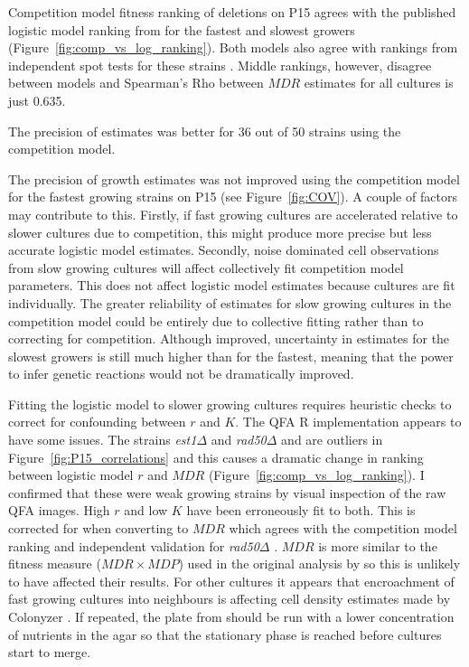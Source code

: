 Competition model fitness ranking of deletions on P15 agrees with the
published logistic model ranking from \citet{Addinall2011} for the
fastest and slowest growers
(Figure~\ref{fig:comp_vs_log_ranking}). Both models also agree with
rankings from independent spot tests for these strains
\citep{maringele2002exo1,zubko2004exo1,Holstein20141259,foster2006mrx}.
Middle rankings, however, disagree between models and Spearman's Rho
between \(MDR\) estimates for all cultures is just 0.635.

The precision of estimates was better for 36 out of 50 strains using
the competition model.

The
precision of growth estimates was not improved using the competition
model for the fastest growing strains on P15 (see
Figure~\ref{fig:COV}). A couple of factors may contribute to
this. Firstly, if fast growing cultures are accelerated relative to
slower cultures due to competition, this might produce more precise
but less accurate logistic model estimates. Secondly, noise dominated
cell observations from slow growing cultures will affect collectively
fit competition model parameters. This does not affect logistic model
estimates because cultures are fit individually. The greater
reliability of estimates for slow growing cultures in the competition
model could be entirely due to collective fitting rather than to
correcting for competition. Although improved, uncertainty in
estimates for the slowest growers is still much higher than for the
fastest, meaning that the power to infer genetic reactions would not
be dramatically improved.

Fitting the logistic model to slower growing cultures requires
heuristic checks to correct for confounding between \(r\) and
\(K\). The QFA R implementation appears to have some issues. The
strains \textit{est1\(\Delta\)} and \textit{rad50\(\Delta\)} and are
outliers in Figure~\ref{fig:P15_correlations} and this causes a
dramatic change in ranking between logistic model \(r\) and \(MDR\)
(Figure~\ref{fig:comp_vs_log_ranking}). I confirmed that these were
weak growing strains by visual inspection of the raw QFA images. High
\(r\) and low \(K\) have been erroneously fit to both. This is
corrected for when converting to \(MDR\) which agrees with the
competition model ranking and independent validation for
\textit{rad50\(\Delta\)} \citep{zubko2004exo1}. \(MDR\) is more
similar to the fitness measure (\(MDR \times MDP\)) used in the
original analysis by \citet{Addinall2011} so this is unlikely to have
affected their results. For other cultures it appears that
encroachment of fast growing cultures into neighbours is affecting
cell density estimates made by Colonyzer \citep{Lawless2010}. If
repeated, the plate from \citet{Addinall2011} should be run with a
lower concentration of nutrients in the agar so that the stationary
phase is reached before cultures start to merge.

